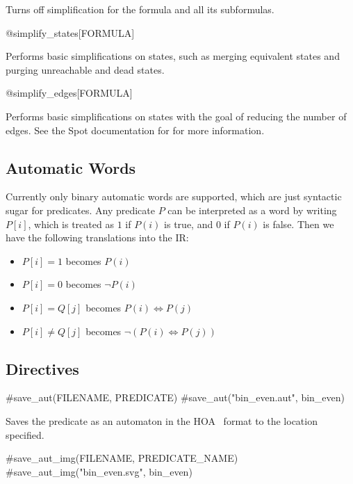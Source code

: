 Turns off simplification for the formula and all its subformulas.

\begin{pecan}
@simplify_states[FORMULA]
\end{pecan}

Performs basic simplifications on states, such as merging equivalent states and purging unreachable and dead states.

\begin{pecan}
@simplify_edges[FORMULA]
\end{pecan}

Performs basic simplifications on states with the goal of reducing the number of edges.
See the Spot documentation for  for more information.

\subsection{Automatic Words}

Currently only binary automatic words are supported, which are just syntactic sugar for predicates.
Any predicate $P$ can be interpreted as a word by writing $P[i]$, which is treated as $1$ if $P(i)$ is true, and $0$ if $P(i)$ is false.
Then we have the following translations into the IR:

\begin{itemize}
    \item $P[i] = 1$ becomes $P(i)$
    \item $P[i] = 0$ becomes $\lnot P(i)$
    \item $P[i] = Q[j]$ becomes $P(i) \iff P(j)$
    \item $P[i] \neq Q[j]$ becomes $\lnot (P(i) \iff P(j))$
\end{itemize}

\subsection{Directives}

\begin{pecan}
#save_aut(FILENAME, PREDICATE)
#save_aut("bin_even.aut", bin_even)
\end{pecan}

Saves the predicate as an automaton in the HOA~\cite{hoa-format} format to the location specified.

\begin{pecan}
#save_aut_img(FILENAME, PREDICATE_NAME)
#save_aut_img("bin_even.svg", bin_even)
\end{pecan}

